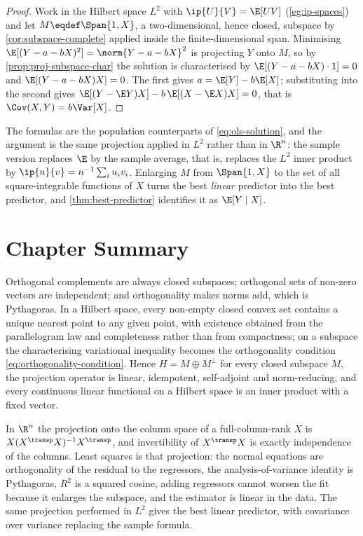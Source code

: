 \begin{proof}
	Work in the Hilbert space $L^2$ with $\ip{U}{V}=\E[UV]$
	(\autoref{eg:ip-spaces}) and let $M\eqdef\Span\{1,X\}$, a two-dimensional,
	hence closed, subspace by \autoref{cor:subspace-complete} applied inside the
	finite-dimensional span. Minimising $\E[(Y-a-bX)^2]=\norm{Y-a-bX}^2$ is
	projecting $Y$ onto $M$, so by \autoref{prop:proj-subspace-char} the solution is
	characterised by $\E[(Y-a-bX)\cdot1]=0$ and $\E[(Y-a-bX)X]=0$. The first gives
	$a=\E[Y]-b\E[X]$; substituting into the second gives
	$\E[(Y-\E Y)X]-b\,\E[(X-\E X)X]=0$, that is $\Cov(X,Y)=b\Var[X]$.
\end{proof}

The formulas are the population counterparts of \eqref{eq:ols-solution}, and the
argument is the same projection applied in $L^2$ rather than in $\R^n$: the
sample version replaces $\E$ by the sample average, that is, replaces the $L^2$
inner product by $\ip{u}{v}=n^{-1}\sum_iu_iv_i$. Enlarging $M$ from
$\Span\{1,X\}$ to the set of all square-integrable functions of $X$ turns the
best \emph{linear} predictor into the best predictor, and
\autoref{thm:best-predictor} identifies it as $\E[Y\mid X]$.

\section{Chapter Summary}\label{sec:proj-summary}

Orthogonal complements are always closed subspaces; orthogonal sets of non-zero
vectors are independent; and orthogonality makes norms add, which is Pythagoras.
In a Hilbert space, every non-empty closed convex set contains a unique nearest
point to any given point, with existence obtained from the parallelogram law and
completeness rather than from compactness; on a subspace the characterising
variational inequality becomes the orthogonality condition
\eqref{eq:orthogonality-condition}. Hence $H=M\oplus M^{\perp}$ for every closed
subspace $M$, the projection operator is linear, idempotent, self-adjoint and
norm-reducing, and every continuous linear functional on a Hilbert space is an
inner product with a fixed vector.

In $\R^n$ the projection onto the column space of a full-column-rank $X$ is
$X(X^{\transp}X)^{-1}X^{\transp}$, and invertibility of $X^{\transp}X$ is exactly
independence of the columns. Least squares is that projection: the normal
equations are orthogonality of the residual to the regressors, the
analysis-of-variance identity is Pythagoras, $R^2$ is a squared cosine, adding
regressors cannot worsen the fit because it enlarges the subspace, and the
estimator is linear in the data. The same projection performed in $L^2$ gives the
best linear predictor, with covariance over variance replacing the sample formula.

